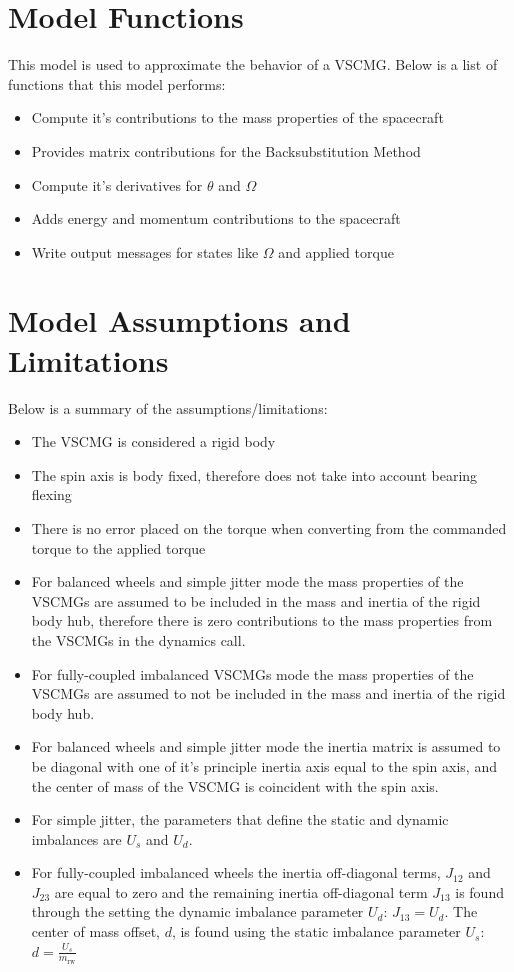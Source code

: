 \section{Model Functions}

This model is used to approximate the behavior of a VSCMG. Below is a list of functions that this model performs:

\begin{itemize}
	\item Compute it's contributions to the mass properties of the spacecraft
	\item Provides matrix contributions for the Backsubstitution Method
	\item Compute it's derivatives for $\theta$ and $\Omega$
	\item Adds energy and momentum contributions to the spacecraft
	\item Write output messages for states like $\Omega$ and applied torque
\end{itemize}

\section{Model Assumptions and Limitations}
Below is a summary of the assumptions/limitations:

\begin{itemize}
	\item The VSCMG is considered a rigid body
	\item The spin axis is body fixed, therefore does not take into account bearing flexing
	\item There is no error placed on the torque when converting from the commanded torque to the applied torque
	\item For balanced wheels and simple jitter mode the mass properties of the VSCMGs are assumed to be included in the mass and inertia of the rigid body hub, therefore there is zero contributions to the mass properties from the VSCMGs in the dynamics call.
	\item For fully-coupled imbalanced VSCMGs mode the mass properties of the VSCMGs are assumed to not be included in the mass and inertia of the rigid body hub.
	\item For balanced wheels and simple jitter mode the inertia matrix is assumed to be diagonal with one of it's principle inertia axis equal to the spin axis, and the center of mass of the VSCMG is coincident with the spin axis.
	\item For simple jitter, the parameters that define the static and dynamic imbalances are $U_s$ and $U_d$.
	\item For fully-coupled imbalanced wheels the inertia off-diagonal terms, $J_{12}$ and $J_{23}$ are equal to zero and the remaining inertia off-diagonal term $J_{13}$ is found through the setting the dynamic imbalance parameter $U_d$: $J_{13} = U_d$. The center of mass offset, $d$, is found using the static imbalance parameter $U_s$: $d = \frac{U_s}{m_{\text{rw}}}$
\end{itemize}
